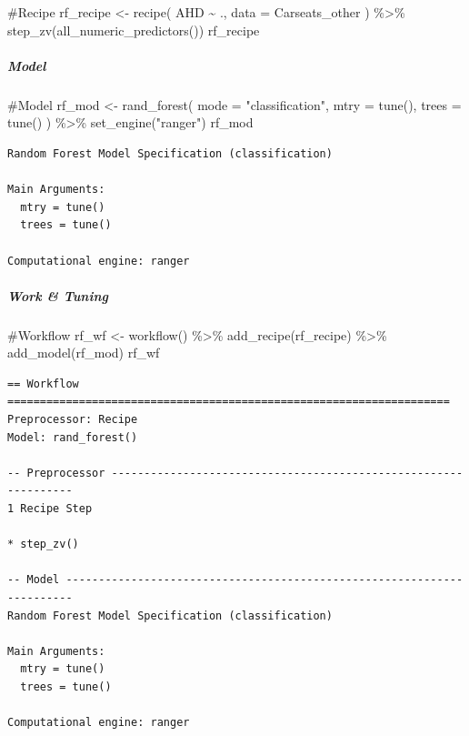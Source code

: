 \documentclass[
]{article}
\let\oldsubparagraph\subparagraph
\renewcommand{\subparagraph}[1]{\oldsubparagraph{#1}\mbox{}}
\newenvironment{Shaded}{\begin{snugshade}}{\end{snugshade}}
\newcommand{\AttributeTok}[1]{\textcolor[rgb]{0.40,0.45,0.13}{#1}}
\newcommand{\CommentTok}[1]{\textcolor[rgb]{0.37,0.37,0.37}{#1}}
\newcommand{\FunctionTok}[1]{\textcolor[rgb]{0.28,0.35,0.67}{#1}}
\newcommand{\NormalTok}[1]{\textcolor[rgb]{0.00,0.23,0.31}{#1}}
\newcommand{\OtherTok}[1]{\textcolor[rgb]{0.00,0.23,0.31}{#1}}
\newcommand{\SpecialCharTok}[1]{\textcolor[rgb]{0.37,0.37,0.37}{#1}}
\newcommand{\StringTok}[1]{\textcolor[rgb]{0.13,0.47,0.30}{#1}}
\begin{document}
\begin{Shaded}
\begin{Highlighting}[]
\CommentTok{\#Recipe}
\NormalTok{rf\_recipe }\OtherTok{\textless{}{-}} 
  \FunctionTok{recipe}\NormalTok{(}
\NormalTok{    AHD }\SpecialCharTok{\textasciitilde{}}\NormalTok{ ., }
    \AttributeTok{data =}\NormalTok{ Carseats\_other}
\NormalTok{  ) }\SpecialCharTok{\%\textgreater{}\%}
  \FunctionTok{step\_zv}\NormalTok{(}\FunctionTok{all\_numeric\_predictors}\NormalTok{())}
\NormalTok{rf\_recipe}
\end{Highlighting}
\end{Shaded}

\hypertarget{model-2}{%
\subparagraph{Model}\label{model-2}}

\begin{Shaded}
\begin{Highlighting}[]
\CommentTok{\#Model}
\NormalTok{rf\_mod }\OtherTok{\textless{}{-}} 
  \FunctionTok{rand\_forest}\NormalTok{(}
    \AttributeTok{mode =} \StringTok{"classification"}\NormalTok{,}
    \AttributeTok{mtry =} \FunctionTok{tune}\NormalTok{(),}
    \AttributeTok{trees =} \FunctionTok{tune}\NormalTok{()}
\NormalTok{  ) }\SpecialCharTok{\%\textgreater{}\%} 
  \FunctionTok{set\_engine}\NormalTok{(}\StringTok{"ranger"}\NormalTok{)}
\NormalTok{rf\_mod}
\end{Highlighting}
\end{Shaded}

\begin{verbatim}
Random Forest Model Specification (classification)

Main Arguments:
  mtry = tune()
  trees = tune()

Computational engine: ranger 
\end{verbatim}

\hypertarget{work-tuning}{%
\subparagraph{Work \& Tuning}\label{work-tuning}}

\begin{Shaded}
\begin{Highlighting}[]
\CommentTok{\#Workflow}
\NormalTok{rf\_wf }\OtherTok{\textless{}{-}} \FunctionTok{workflow}\NormalTok{() }\SpecialCharTok{\%\textgreater{}\%}
  \FunctionTok{add\_recipe}\NormalTok{(rf\_recipe) }\SpecialCharTok{\%\textgreater{}\%}
  \FunctionTok{add\_model}\NormalTok{(rf\_mod)}
\NormalTok{rf\_wf}
\end{Highlighting}
\end{Shaded}

\begin{verbatim}
== Workflow ====================================================================
Preprocessor: Recipe
Model: rand_forest()

-- Preprocessor ----------------------------------------------------------------
1 Recipe Step

* step_zv()

-- Model -----------------------------------------------------------------------
Random Forest Model Specification (classification)

Main Arguments:
  mtry = tune()
  trees = tune()

Computational engine: ranger 
\end{verbatim}
\end{document}
